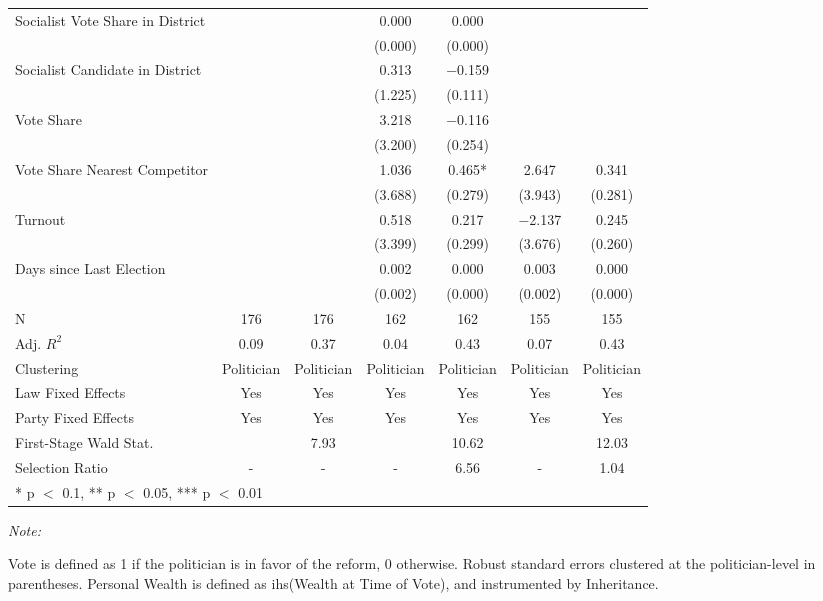 \begin{table}[!h]
{\begin{threeparttable}
\begin{tabular}[t]{lcccccc}
Socialist Vote Share in District &  &  & \num{0.000} & \num{0.000} &  & \\
 &  &  & (\num{0.000}) & (\num{0.000}) &  & \\
Socialist Candidate in District &  &  & \num{0.313} & \num{-0.159} &  & \\
 &  &  & (\num{1.225}) & (\num{0.111}) &  & \\
Vote Share &  &  & \num{3.218} & \num{-0.116} &  & \\
 &  &  & (\num{3.200}) & (\num{0.254}) &  & \\
Vote Share Nearest Competitor &  &  & \num{1.036} & \num{0.465}* & \num{2.647} & \num{0.341}\\
 &  &  & (\num{3.688}) & (\num{0.279}) & (\num{3.943}) & (\num{0.281})\\
Turnout &  &  & \num{0.518} & \num{0.217} & \num{-2.137} & \num{0.245}\\
 &  &  & (\num{3.399}) & (\num{0.299}) & (\num{3.676}) & (\num{0.260})\\
Days since Last Election &  &  & \num{0.002} & \num{0.000} & \num{0.003} & \num{0.000}\\
 &  &  & (\num{0.002}) & (\num{0.000}) & (\num{0.002}) & (\num{0.000})\\
\midrule
N & \num{176} & \num{176} & \num{162} & \num{162} & \num{155} & \num{155}\\
Adj. $R^2$ & \num{0.09} & \num{0.37} & \num{0.04} & \num{0.43} & \num{0.07} & \num{0.43}\\
Clustering & Politician & Politician & Politician & Politician & Politician & Politician\\
Law Fixed Effects & Yes & Yes & Yes & Yes & Yes & Yes\\
Party Fixed Effects & Yes & Yes & Yes & Yes & Yes & Yes\\
First-Stage Wald Stat. &  & 7.93 &  & 10.62 &  & 12.03\\
Selection Ratio & - & - & - & 6.56 & - & 1.04\\
\bottomrule
\multicolumn{7}{l}{\rule{0pt}{1em}* p $<$ 0.1, ** p $<$ 0.05, *** p $<$ 0.01}\\
\end{tabular}
\begin{tablenotes}[para]
\item \textit{Note: } 
\item Vote is defined as 1 if the politician is in favor of the reform, 0 otherwise. Robust standard errors clustered at the politician-level in parentheses. Personal Wealth is defined as ihs(Wealth at Time of Vote), and instrumented by Inheritance.
\end{tablenotes}
\end{threeparttable}}
\end{table}
